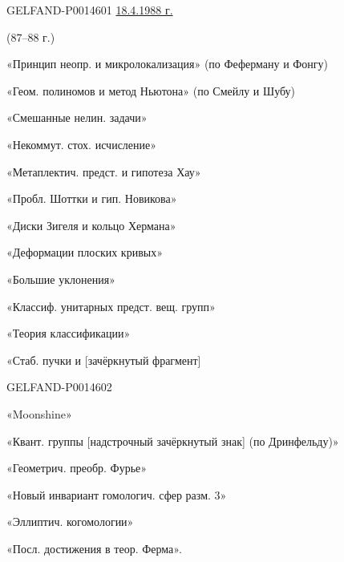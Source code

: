 \begin{GelfandAdjacentEvidence}{GELFAND-P001460}{1}
\underline{18.4.1988 г.}\qquad {}

 (\(87\text{--}88\) г.)

\quad «Принцип неопр. и микролокализация» (по Феферману и Фонгу)

«Геом. полиномов и метод Ньютона» (по Смейлу и Шубу)

«Смешанные нелин. задачи»

«Некоммут. стох. исчисление»

«Метаплектич. предст. и гипотеза Хау»

«Пробл. Шоттки и гип. Новикова»

\quad «Диски Зигеля и кольцо Хермана»

«Деформации плоских кривых»

«Большие уклонения»

«Классиф. унитарных предст. вещ. групп»

«Теория классификации»

«Стаб. пучки и [зачёркнутый фрагмент]
\end{GelfandAdjacentEvidence}
\begin{GelfandAdjacentEvidence}{GELFAND-P001460}{2}


«Moonshine»

\quad «Квант. группы [надстрочный зачёркнутый знак] (по Дринфельду)»
\end{GelfandAdjacentEvidence}


\quad «Геометрич. преобр. Фурье»

«Новый инвариант гомологич. сфер разм. \(3\)»

«Эллиптич. когомологии»

«Посл. достижения в теор. Ферма».


